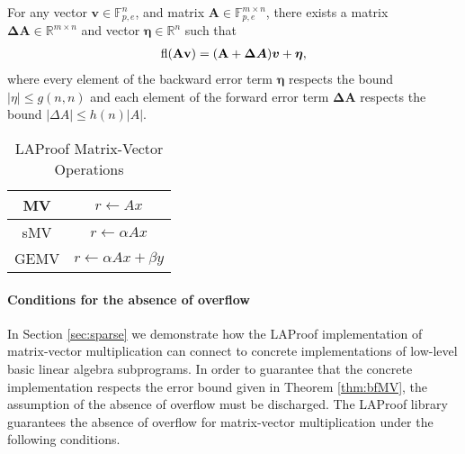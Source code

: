 \begin{theorem} For any vector
${\textbf{v}} \in \mathbb{F}_{p,e}^n$,
and matrix ${\bm{A}} \in \mathbb{F}_{p,e}^{m\times n}$,  there exists a matrix ${\bm{\Delta A}} \in \mathbb{R}^{m\times n}$ and vector ${\bm{\eta}} \in \mathbb{R}^n$ such that
\begin{align}\fl({\textbf{A}} {\textbf{v}}) = (\textbf{A} + \bm{\Delta A}) \bm{v} + {\bm{\eta}} ,\label{eq:bfMV}
\end{align} 
where every element of the backward error term $\bm{\eta}$ respects
the bound $| \eta| \le g(n,n) $ and each element of the forward error term $\bm{\Delta A}$ respects the bound
 $|{\Delta A}| \le h(n) | A | $.
\label{thm:bfMV}
\end{theorem}

\begin{table}[htbp]
\caption{LAProof Matrix-Vector Operations}
\label{tab:matvecops}
\begin{center}
\setlength{\tabcolsep}{0.5em} %
{\renewcommand{\arraystretch}{1.4}%
\begin{tabular}{|c|c|}
\hline
    MV & $r \leftarrow A x$   \\
\hline
\hline
sMV &$ r  \leftarrow \alpha A x $   \\
\hline
GEMV &  $r \leftarrow \alpha Ax  + \beta y$   \\ 
\hline
\end{tabular} }
\end{center}
\end{table}

\paragraph{Conditions for the absence of overflow}  In Section \ref{sec:sparse} we demonstrate how the LAProof implementation of  matrix-vector multiplication can connect to concrete implementations of low-level basic linear algebra subprograms. In order to guarantee that the concrete implementation respects the error bound given in  Theorem \ref{thm:bfMV}, the assumption of the absence of overflow must be discharged. The LAProof library guarantees the absence of overflow for matrix-vector multiplication under the following conditions. 

